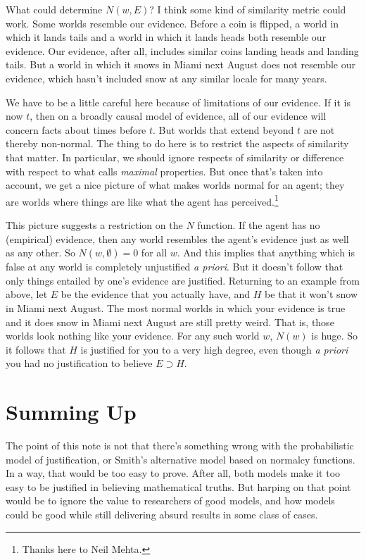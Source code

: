 What could determine $N(w, E)$? I think some kind of similarity metric could work. Some worlds resemble our evidence. Before a coin is flipped, a world in which it lands tails and a world in which it lands heads both resemble our evidence. Our evidence, after all, includes similar coins landing heads and landing tails. But a world in which it snows in Miami next August does not resemble our evidence, which hasn't included snow at any similar locale for many years.

We have to be a little careful here because of limitations of our evidence. If it is now $t$, then on a broadly causal model of evidence, all of our evidence will concern facts about times before $t$. But worlds that extend beyond $t$ are not thereby non-normal. The thing to do here is to restrict the aspects of similarity that matter. In particular, we should ignore respects of similarity or difference with respect to what \citet{Sider2001} calls \emph{maximal} properties. But once that's taken into account, we get a nice picture of what makes worlds normal for an agent; they are worlds where things are like what the agent has perceived.\footnote{Thanks here to Neil Mehta.}

This picture suggests a restriction on the $N$ function. If the agent has no (empirical) evidence, then any world resembles the agent's evidence just as well as any other. So $N(w, \emptyset) = 0$ for all $w$. And this implies that anything which is false at any world is completely unjustified \emph{a priori}. But it doesn't follow that only things entailed by one's evidence are justified. Returning to an example from above, let $E$ be the evidence that you actually have, and $H$ be that it won't snow in Miami next August. The most normal worlds in which your evidence is true and it does snow in Miami next August are still pretty weird. That is, those worlds look nothing like your evidence. For any such world $w$, $N(w)$ is huge. So it follows that $H$ is justified for you to a very high degree, even though \emph{a priori} you had no justification to believe $E \supset H$.

\section{Summing Up}
\label{summingup}

The point of this note is not that there's something wrong with the probabilistic model of justification, or Smith's alternative model based on normalcy functions. In a way, that would be too easy to prove. After all, both models make it too easy to be justified in believing mathematical truths. But harping on that point would be to ignore the value to researchers of good models, and how models could be good while still delivering absurd results in some class of cases.

